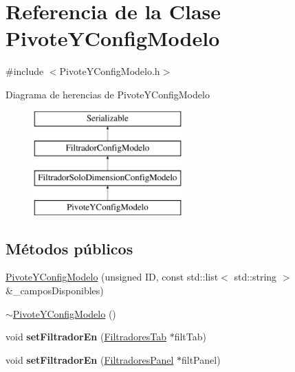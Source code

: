 \hypertarget{classPivoteYConfigModelo}{\section{\-Referencia de la \-Clase \-Pivote\-Y\-Config\-Modelo}
\label{classPivoteYConfigModelo}
}


{\ttfamily \#include $<$\-Pivote\-Y\-Config\-Modelo.\-h$>$}

\-Diagrama de herencias de \-Pivote\-Y\-Config\-Modelo\begin{figure}[H]
\begin{center}
\leavevmode
\includegraphics[height=4.000000cm]{classPivoteYConfigModelo}
\end{center}
\end{figure}
\subsection*{\-Métodos públicos}
\begin{DoxyCompactItemize}
\item 
\hyperlink{classPivoteYConfigModelo_aac9fb16f6f04de97bb0e5b002d92c2ad}{\-Pivote\-Y\-Config\-Modelo} (unsigned \-I\-D, const std\-::list$<$ std\-::string $>$ \&\-\_\-campos\-Disponibles)
\item 
\hyperlink{classPivoteYConfigModelo_a42a54de46c22381c38c8ed4f6066bb60}{$\sim$\-Pivote\-Y\-Config\-Modelo} ()
\item 
\hypertarget{classPivoteYConfigModelo_a94c8fd7eff1075a35ac9a33540ffa6b0}{void {\bfseries set\-Filtrador\-En} (\hyperlink{classFiltradoresTab}{\-Filtradores\-Tab} $\ast$filt\-Tab)}\label{classPivoteYConfigModelo_a94c8fd7eff1075a35ac9a33540ffa6b0}

\item 
\hypertarget{classPivoteYConfigModelo_a149adb0920bcc66049dd583740368d5a}{void {\bfseries set\-Filtrador\-En} (\hyperlink{classFiltradoresPanel}{\-Filtradores\-Panel} $\ast$filt\-Panel)}\label{classPivoteYConfigModelo_a149adb0920bcc66049dd583740368d5a}

\end{DoxyCompactItemize}


